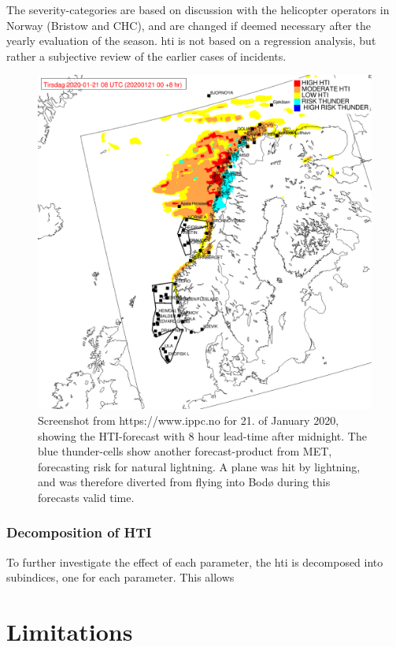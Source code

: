 The severity-categories are based on discussion with the helicopter operators in Norway (Bristow and CHC), and are changed if deemed necessary after the yearly evaluation of the season. \acrshort{hti} is not based on a regression analysis, but rather a subjective review of the earlier cases of incidents.
\begin{figure}
    \centering
    \includegraphics[width=\textwidth]{Figures/hti.png}
    \caption{Screenshot from https://www.ippc.no for 21. of January 2020, showing the HTI-forecast with 8 hour lead-time after midnight. The blue thunder-cells show another forecast-product from MET, forecasting risk for natural lightning. A plane was hit by lightning, and was therefore diverted from flying into Bodø during this forecasts valid time. }
    \label{fig:hti}
\end{figure}

\subsubsection{Decomposition of HTI}\label{sec:decomposition}

To further investigate the effect of each parameter, the \acrshort{hti} is decomposed into subindices, one for each parameter. This allows 

\section{Limitations}
